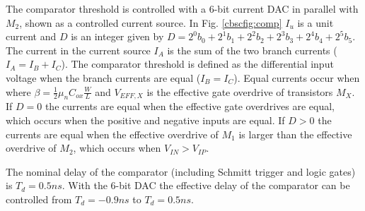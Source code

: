 The comparator threshold is controlled with a 6-bit current DAC in
parallel with $M_2$, shown as a controlled current source. In Fig. \ref{cbscfig:comp} $I_u$ is a unit current
and $D$ is an integer given by $D = 2^0b_0 + 2^1b_1 + 2^2b_2 + 2^3b_3
+2^4b_4 + 2^5b_5$.  The current in the current source $I_A$ is the sum of the
two branch currents ($I_A = I_B + I_C$). The comparator threshold is
defined as the differential input voltage when the branch currents are
equal ($I_B = I_C$). Equal currents occur when
where $\beta = \frac{1}{2}\mu_n C_{ox} \frac{W}{L}$ and $V_{EFF,X}$ is
the effective gate overdrive of transistors $M_X$. If $D=0$ the
currents are equal when the effective gate overdrives are equal,
which occurs when the positive and negative inputs are equal. If $ D >
0$ the currents are equal when the effective 
overdrive of $M_1$ is larger than the effective overdrive of $M_2$,
which occurs when $V_{IN} > V_{IP}$. 

The nominal
delay of the comparator (including Schmitt trigger and logic gates) is
$T_d = 0.5ns$. With the 6-bit DAC the effective delay of the comparator
can be controlled from $T_d = -0.9ns$ to $T_d = 0.5ns$.


